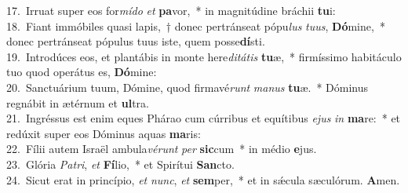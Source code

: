 {17.~}Irruat super eos for\textit{mí}\textit{do} \textit{et} \textbf{pa}vor,~* in magnitúdine bráchii \textbf{tu}i:\\
{18.~}Fiant immóbiles quasi lapis,~† donec pertránseat pópu\textit{lus} \textit{tu}\textit{us}, \textbf{Dó}mine,~* donec pertránseat pópulus tuus iste, quem posse\textbf{dí}sti.\\
{19.~}Introdúces eos, et plantábis in monte here\textit{di}\textit{tá}\textit{tis} \textbf{tu}æ,~* firmíssimo habitáculo tuo quod operátus es, \textbf{Dó}mine:\\
{20.~}Sanctuárium tuum, Dómine, quod firmavé\textit{runt} \textit{ma}\textit{nus} \textbf{tu}æ.~* Dóminus regnábit in ætérnum et \textbf{ul}tra.\\
{21.~}Ingréssus est enim eques Phárao cum cúrribus et equítibus \textit{e}\textit{jus} \textit{in} \textbf{ma}re:~* et redúxit super eos Dóminus aquas \textbf{ma}ris:\\
{22.~}Fílii autem Israël ambula\textit{vé}\textit{runt} \textit{per} \textbf{sic}cum~* in médio \textbf{e}jus.\\
{23.~}Glória \textit{Pa}\textit{tri}, \textit{et} \textbf{Fí}lio,~* et Spirítui \textbf{San}cto.\\
{24.~}Sicut erat in princípio, \textit{et} \textit{nunc}, \textit{et} \textbf{sem}per,~* et in sǽcula sæculórum. \textbf{A}men.\\
